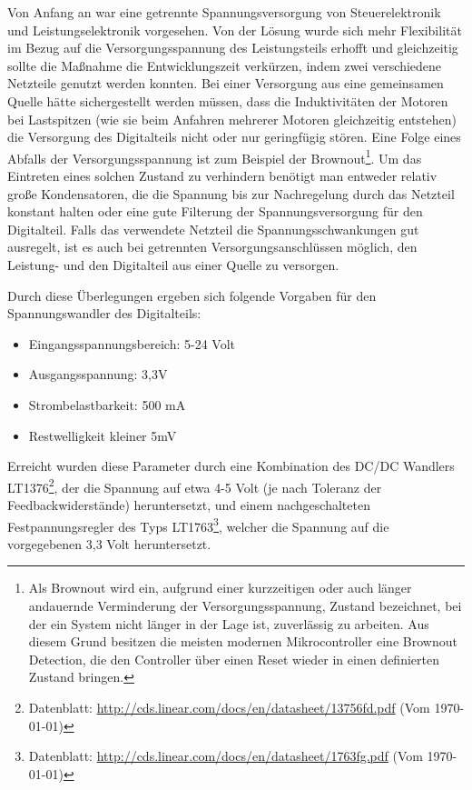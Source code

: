 \documentclass{scrartcl}
\begin{document}
Von Anfang an war eine getrennte Spannungsversorgung von Steuerelektronik und Leistungselektronik vorgesehen. Von der Lösung wurde sich mehr Flexibilität im Bezug auf die Versorgungsspannung des Leistungsteils erhofft und gleichzeitig sollte die Maßnahme die Entwicklungszeit verkürzen, indem zwei verschiedene Netzteile genutzt werden konnten. Bei einer Versorgung aus eine gemeinsamen Quelle hätte sichergestellt werden müssen, dass die Induktivitäten der Motoren bei Lastspitzen (wie sie beim Anfahren mehrerer Motoren gleichzeitig entstehen) die Versorgung des Digitalteils nicht oder nur geringfügig stören. Eine Folge eines Abfalls der Versorgungsspannung ist zum Beispiel der Brownout\footnote{Als Brownout wird ein, aufgrund einer kurzzeitigen oder auch länger andauernde Verminderung der Versorgungsspannung, Zustand bezeichnet, bei der ein System nicht länger in der Lage ist, zuverlässig zu arbeiten. Aus diesem Grund besitzen die meisten modernen Mikrocontroller eine Brownout Detection, die den Controller über einen Reset wieder in einen definierten Zustand bringen. }. Um das Eintreten eines solchen Zustand zu verhindern benötigt man entweder relativ große Kondensatoren, die die Spannung bis zur Nachregelung durch das Netzteil konstant halten oder eine gute Filterung der Spannungsversorgung für den Digitalteil.\newline
Falls das verwendete Netzteil die Spannungsschwankungen gut ausregelt, ist es auch bei getrennten Versorgungsanschlüssen möglich, den Leistung- und den Digitalteil aus einer Quelle zu versorgen. \newline

Durch diese Überlegungen ergeben sich folgende Vorgaben für den Spannungswandler des Digitalteils: \newline
\begin{itemize}
\item{Eingangsspannungsbereich: 5-24 Volt}
\item{Ausgangsspannung: 3,3V}
\item{Strombelastbarkeit: 500 mA}
\item{Restwelligkeit kleiner 5mV}
\end{itemize}
Erreicht wurden diese Parameter durch eine Kombination des DC/DC Wandlers LT1376\footnote{Datenblatt: \url{http://cds.linear.com/docs/en/datasheet/13756fd.pdf} (Vom \today)}, der die Spannung auf etwa 4-5 Volt (je nach Toleranz der Feedbackwiderstände) heruntersetzt, und einem nachgeschalteten Festpannungsregler des Typs LT1763\footnote{Datenblatt: \url{http://cds.linear.com/docs/en/datasheet/1763fg.pdf} (Vom \today)}, welcher die Spannung auf die vorgegebenen 3,3 Volt heruntersetzt.
\end{document}
